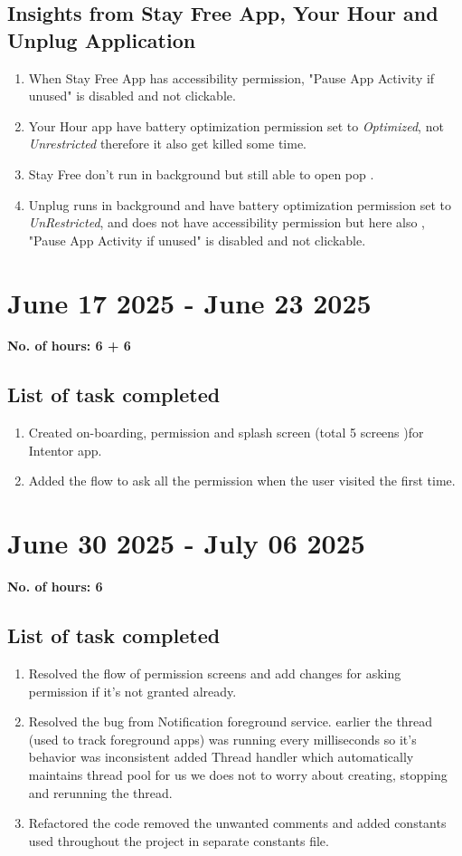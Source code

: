 \documentclass[12pt]{article}
\begin{document}
    \subsection{Insights from Stay Free App, Your Hour and Unplug Application}
    \begin{enumerate}
        \item When Stay Free App has accessibility permission, "Pause App Activity if unused" is disabled and not clickable.
        \item Your Hour app have battery optimization permission set to \textit{Optimized}, not \textit{Unrestricted} therefore it also get killed some time.
        \item Stay Free don't run in background but still able to open pop .
        \item Unplug runs in background and have battery optimization permission set to \textit{UnRestricted}, and does not have accessibility permission but here also , "Pause App Activity if unused" is disabled and not clickable.
    
    \end{enumerate}
    \section{June 17 2025 - June 23 2025}
    {\bf No. of hours: 6 + 6}
    \subsection{List of task completed}
    \begin{enumerate}
        \item Created on-boarding, permission and splash screen (total 5 screens )for Intentor app.
        \item Added the flow to ask all the permission when the user visited the first time.
    \end{enumerate}
    
    \section{June 30 2025 - July 06 2025}
    {\bf No. of hours: 6}
    \subsection{List of task completed}
    \begin{enumerate}
        \item Resolved the flow of permission screens and add changes for asking permission if it's not granted already.
        \item Resolved the bug from Notification foreground service. earlier the thread (used to track foreground apps) was running every milliseconds so it's behavior was inconsistent added Thread handler which automatically maintains thread pool for us we does not to worry about creating, stopping and rerunning the thread.
        \item Refactored the code removed the unwanted comments and added constants used throughout the project in separate constants file.
    \end{enumerate}
\end{document}
